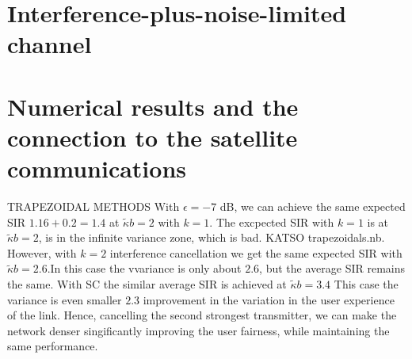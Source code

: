 \documentclass[lettersize,journal]{IEEEtran}
\begin{document}
\section{Interference-plus-noise-limited channel}

\section{Numerical results and the connection to the satellite communications}
TRAPEZOIDAL METHODS
With $\epsilon = -7$ dB, we can achieve the same expected SIR $1.16+0.2=1.4$ at $\tilde{\kappa} b= 2$ with $k=1$.  The excpected SIR with $k=1$ is at $\tilde{\kappa} b = 2$, is in the infinite variance zone, which is bad. KATSO trapezoidals.nb. However, with $k=2$ interference cancellation we get the same expected SIR with $\tilde{\kappa}b =2.6$.In this case the vvariance is  only about $2.6$, but the average SIR remains the same. With SC the similar average SIR is achieved at $\tilde{\kappa}b = 3.4$ This case the variance is even smaller $2.3$ improvement in the variation in the user experience of the link.  Hence, cancelling the second strongest transmitter, we can make the network denser singificantly improving the user fairness, while maintaining the same performance.

\end{document}
